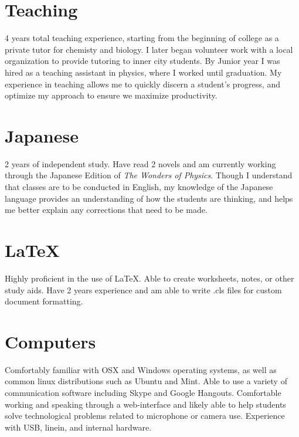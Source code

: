 \documentclass[letterpaper]{easyCV}
\begin{document}
\address{\small{Place where you live}}

\begin{sidebar}{10.5pt}

\section{Teaching}
4 years total teaching experience, starting from the beginning of college 
as a private tutor for chemisty and biology.
I later began volunteer work with a local organization to provide tutoring
to inner city students.  By Junior year I was hired as a teaching assistant in physics,
where I worked until graduation.  My experience in teaching allows me to quickly discern
a student's progress, and optimize my approach to ensure we maximize productivity.  


\section{Japanese}
2 years of independent study.
Have read 2 novels and am currently working through 
the Japanese Edition of \textit{The Wonders of Physics}.  Though I understand that
classes are to be conducted in English, my knowledge of the Japanese language provides
an understanding of how the students are thinking, 
and helps me better explain any corrections that need to be made.

\section{\LaTeX}       
Highly proficient in the use of \LaTeX.  Able to create worksheets,
notes, or other study aids.  Have 2 years experience and am able to write .cls files
for custom document formatting.  

\section{Computers}
Comfortably familiar with OSX and Windows operating systems,
as well as common linux distributions such as Ubuntu and Mint.
Able to use a variety of communication software including Skype
and Google Hangouts.  Comfortable working and speaking through a web-interface
and likely able to help students solve technological problems
related to microphone or camera use.  Experience with USB, linein, and internal hardware. 
\end{sidebar}
\end{document}
